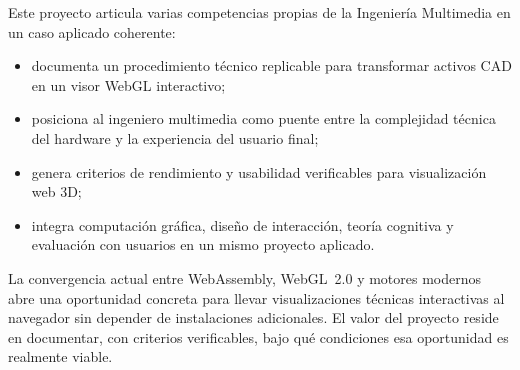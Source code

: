 Este proyecto articula varias competencias propias de la Ingenier\'ia Multimedia en un caso aplicado coherente:

\begin{itemize}
    \item documenta un procedimiento t\'ecnico replicable para transformar activos CAD en un visor WebGL interactivo;
    \item posiciona al ingeniero multimedia como puente entre la complejidad t\'ecnica del hardware y la experiencia del usuario final;
    \item genera criterios de rendimiento y usabilidad verificables para visualizaci\'on web 3D;
    \item integra computaci\'on gr\'afica, dise\~no de interacci\'on, teor\'ia cognitiva y evaluaci\'on con usuarios en un mismo proyecto aplicado.
\end{itemize}

La convergencia actual entre WebAssembly, WebGL~2.0 y motores modernos abre una oportunidad concreta para llevar visualizaciones t\'ecnicas interactivas al navegador sin depender de instalaciones adicionales. El valor del proyecto reside en documentar, con criterios verificables, bajo qu\'e condiciones esa oportunidad es realmente viable.

\newpage
